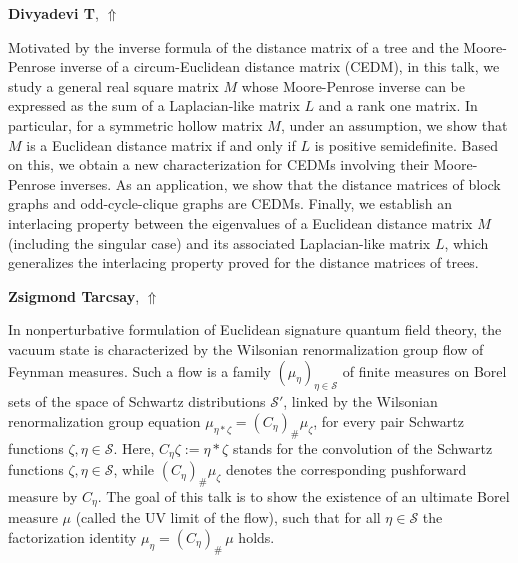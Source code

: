 \documentclass[ILAS2025-program.tex]{subfiles}
\begin{document}
\hypertarget{down0084}{}\begin{ilasabstract}
    
\textbf{Divyadevi T},  \hfill \hyperlink{up0084}{$\Uparrow$}
    
    
\mtskip
    Motivated by the inverse formula of the distance matrix of a tree and the 
Moore-Penrose inverse of a circum-Euclidean distance matrix (CEDM), in this 
talk, we study a general real square matrix $M$  whose Moore-Penrose inverse 
can be expressed as the sum of a Laplacian-like matrix $L$  and a rank one 
matrix. In particular, for a symmetric hollow matrix $M$, under an assumption, 
we show that $M$ is a Euclidean distance matrix if and only if $L$ is positive 
semidefinite.  Based on this, we obtain a new characterization for CEDMs 
involving their Moore-Penrose inverses. As an application, we show that the 
distance matrices of block graphs and odd-cycle-clique graphs are CEDMs. 
Finally, we establish an interlacing property between the eigenvalues of  a
Euclidean distance matrix $M$ (including the singular case) and its associated 
Laplacian-like matrix $L$, which generalizes the interlacing property proved 
for the distance matrices of trees. 

\end{ilasabstract}
    

\hypertarget{down0418}{}\begin{ilasabstract}
    
\textbf{Zsigmond Tarcsay},  \hfill \hyperlink{up0418}{$\Uparrow$}
    
    
\mtskip
    In nonperturbative formulation of Euclidean signature quantum field theory, the vacuum state is characterized by the Wilsonian renormalization group  flow of Feynman measures. Such a  flow is a family $(\mu_\eta)_{\eta\in\mathcal S}$ of finite measures on Borel sets  of the space of Schwartz distributions $\mathcal S'$, linked by the Wilsonian renormalization group equation $\mu^{}_{\eta*\zeta}=(C_\eta)^{}_{\#}\mu^{}_\zeta$, for every pair Schwartz functions $\zeta,\eta\in \mathcal S$. Here, $C_\eta\zeta:=\eta*\zeta$ stands for the convolution of  the Schwartz functions $\zeta,\eta\in \mathcal{S}$, while $(C_\eta)_{\#}\mu_\zeta$ denotes the corresponding pushforward measure by $C_\eta$. The goal of this talk is to show the existence of an ultimate Borel measure $\mu$ (called the UV limit of the flow), such that for all $\eta\in\mathcal{S}$ the factorization identity $\mu_{\eta}=(C_{\eta})_{\#}\,\mu$ holds.
\end{ilasabstract}
    
\end{document}

